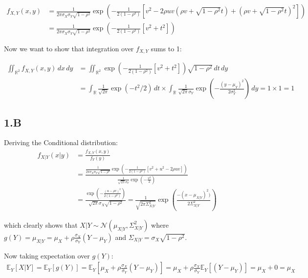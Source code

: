 \documentclass{article}
\begin{document}
\begin{align*}
    f_{X,Y}(x,y) &= \frac{1}{2\pi \sigma_X \sigma_Y \sqrt{1-\rho^2}} 
    \exp\left( - \frac{1}{2 (1-\rho^2)} \left[
    v^2 - 2\rho u v (\rho v + \sqrt{1-\rho^2} t) + (\rho v + \sqrt{1-\rho^2} t)^2
    \right] \right) \\
    &= \frac{1}{2\pi \sigma_X \sigma_Y \sqrt{1-\rho^2}} 
    \exp\left( - \frac{1}{2 (1-\rho^2)} \left[
    v^2 + t^2
    \right] \right)
\end{align*}


Now we want to show that integration over $f_{X,Y} $ sums to 1:

\begin{align*}
\iint_{\mathbb{R}^2}
    f_{X,Y}(x,y) \, dx \, dy &= \iint_{\mathbb{R}^2} \exp\left( - \frac{1}{2 (1-\rho^2)} \left[
    v^2 + t^2
    \right] \right) \sqrt{1-\rho^2} \, dt \, dy \\
    &= \int_{\mathbb{R}} \frac{1}{\sqrt{2\pi}} \exp( -t^2 /2) \, dt \times \int_{\mathbb{R}} \frac{1}{\sqrt{2\pi}\sigma_Y} \exp\left( - \frac{(y-\mu_Y)^2}{2\sigma_Y^2}\right) \, dy = 1 \times 1 = 1
\end{align*}
\subsection*{1.B}
Deriving the Conditional distribution: 
\begin{align*}
    f_{X|Y} (x|y) &= \frac{f_{X,Y}(x,y)}{f_Y(y)} \\
    &= \frac{
    \frac{1}{2\pi \sigma_X \sigma_Y \sqrt{1-\rho^2}} 
    \exp\left( - \frac{1}{2 (1-\rho^2)} \left[
    v^2 + u^2 - 2\rho u v
    \right] \right)
    }{
    \frac{1}{\sqrt{2\pi}\sigma_Y} \exp\left( - \frac{v^2}{2} \right)
    } \\
    &= \frac{ 
    \exp\left( - \frac{(u - \rho v)^2}{2 (1-\rho^2)} \right)
    }{\sqrt{2\pi} \sigma_X \sqrt{1-\rho^2}} = \frac{1}{\sqrt{2\pi \Sigma_{X|Y}^2}} \exp(\frac{-(x - \mu_{X|Y})^2)}{2 \Sigma_{X|Y}^2} )
\end{align*}

which clearly shows that $X|Y \sim \mathcal{N}(\mu_{X|Y}, \Sigma_{X|Y}^2)$ where $g(Y) = \mu_{X|Y} = \mu_X + \rho \frac{\sigma_X}{\sigma_Y}(Y - \mu_Y) $ and 
$\Sigma_{X|Y}= \sigma_X \sqrt{1-\rho^2}$.

Now taking expectation over $g(Y)$:
\begin{align*}
    \mathbb{E}_Y [X|Y] = \mathbb{E}_Y [ g(Y)]  = \mathbb{E}_Y [ \mu_X + \rho \frac{\sigma_X}{\sigma_Y}(Y - \mu_Y) ] = \mu_X +  \rho \frac{\sigma_X}{\sigma_Y}\mathbb{E}_Y [(Y - \mu_Y)] = \mu_X + 0 = \mu_X
\end{align*}
\end{document}
